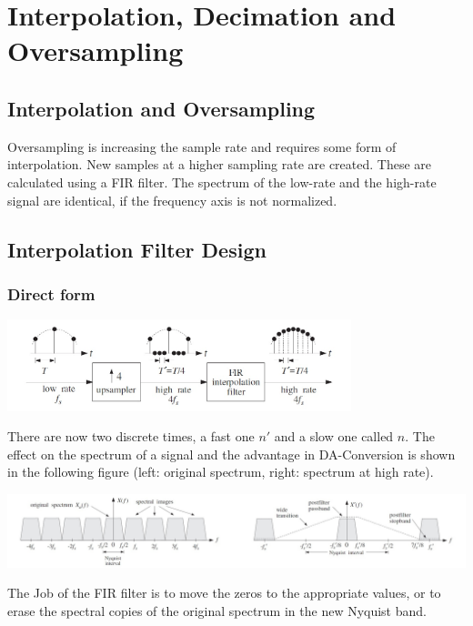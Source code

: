 \section{Interpolation, Decimation and Oversampling}
\subsection{Interpolation and Oversampling}
Oversampling is increasing the sample rate and requires some form of interpolation. New samples at a higher sampling rate are created. These are calculated using a FIR filter. The spectrum of the low-rate and the high-rate signal are identical, if the frequency axis is not normalized.

\subsection{Interpolation Filter Design}
\subsubsection{Direct form}

\begin{center}
	\includegraphics[width=10cm]{images/IntDecOv_IncSamplingRate.jpg}
\end{center}

There are now two discrete times, a fast one $n'$ and a slow one called $n$. 
The effect on the spectrum of a signal and the advantage in DA-Conversion is
shown in the following figure (left: original spectrum, right: spectrum
at high rate).

\begin{center}
	\includegraphics[width=16cm]{images/IntDecOv_Spectrum.jpg}
\end{center}

The Job of the FIR filter is to move the zeros to the appropriate values, 
or to erase the spectral copies of the original spectrum in the new 
Nyquist band. \\

